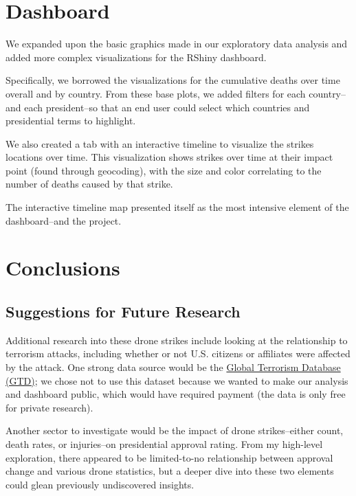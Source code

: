 \documentclass[
]{article}
\begin{document}
\hypertarget{dashboard}{%
\section{Dashboard}\label{dashboard}}

We expanded upon the basic graphics made in our exploratory data
analysis and added more complex visualizations for the RShiny dashboard.

Specifically, we borrowed the visualizations for the cumulative deaths
over time overall and by country. From these base plots, we added
filters for each country--and each president--so that an end user could
select which countries and presidential terms to highlight.

We also created a tab with an interactive timeline to visualize the
strikes locations over time. This visualization shows strikes over time
at their impact point (found through geocoding), with the size and color
correlating to the number of deaths caused by that strike.

The interactive timeline map presented itself as the most intensive
element of the dashboard--and the project.

\hypertarget{conclusions}{%
\section{Conclusions}\label{conclusions}}

\hypertarget{suggestions-for-future-research}{%
\subsection{Suggestions for Future
Research}\label{suggestions-for-future-research}}

Additional research into these drone strikes include looking at the
relationship to terrorism attacks, including whether or not U.S.
citizens or affiliates were affected by the attack. One strong data
source would be the \href{https://start.umd.edu/gtd/}{Global Terrorism
Database (GTD)}; we chose not to use this dataset because we wanted to
make our analysis and dashboard public, which would have required
payment (the data is only free for private research).

Another sector to investigate would be the impact of drone
strikes--either count, death rates, or injuries--on presidential
approval rating. From my high-level exploration, there appeared to be
limited-to-no relationship between approval change and various drone
statistics, but a deeper dive into these two elements could glean
previously undiscovered insights.
\end{document}
